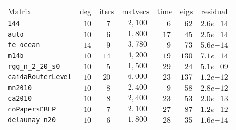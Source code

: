 \begin{tabular}{l|c|c|c|c|c|c}
\hline
\multirow{2}{*}{Matrix} & \multirow{2}{*}{deg} & \multirow{2}{*}{iters} & \multirow{2}{*}{matvecs} & \multirow{2}{*}{time} & \multirow{2}{*}{eigs} & \multirow{2}{*}{residual} \\
 & & & & & & \\\hline
\hline
\verb|144| & $\phantom{0}10$ & $\phantom{0}7$ & $\phantom{0}2,100$ & $\phantom{00}6$ & $\phantom{0}62$ & $2.6e{-14}$ \\\hline
\verb|auto| & $\phantom{0}10$ & $\phantom{0}6$ & $\phantom{0}1,800$ & $\phantom{0}17$ & $\phantom{0}45$ & $2.5e{-14}$ \\\hline
\verb|fe_ocean| & $\phantom{0}14$ & $\phantom{0}9$ & $\phantom{0}3,780$ & $\phantom{00}9$ & $\phantom{0}73$ & $5.6e{-14}$ \\\hline
\verb|m14b| & $\phantom{0}10$ & $14$ & $\phantom{0}4,200$ & $\phantom{0}19$ & $130$ & $7.1e{-14}$ \\\hline
\verb|rgg_n_2_20_s0| & $\phantom{0}10$ & $\phantom{0}5$ & $\phantom{0}1,500$ & $\phantom{0}29$ & $\phantom{0}24$ & $5.1e{-09}$ \\\hline
\verb|caidaRouterLevel| & $\phantom{0}10$ & $20$ & $\phantom{0}6,000$ & $\phantom{0}23$ & $137$ & $1.2e{-12}$ \\\hline
\verb|mn2010| & $\phantom{0}10$ & $\phantom{0}8$ & $\phantom{0}2,400$ & $\phantom{00}9$ & $\phantom{0}58$ & $2.8e{-12}$ \\\hline
\verb|ca2010| & $\phantom{0}10$ & $\phantom{0}8$ & $\phantom{0}2,400$ & $\phantom{0}23$ & $\phantom{0}53$ & $2.0e{-13}$ \\\hline
\verb|coPapersDBLP| & $\phantom{0}10$ & $\phantom{0}7$ & $\phantom{0}2,100$ & $\phantom{0}27$ & $\phantom{0}87$ & $1.2e{-12}$ \\\hline
\verb|delaunay_n20| & $\phantom{0}10$ & $\phantom{0}6$ & $\phantom{0}1,800$ & $\phantom{0}28$ & $\phantom{0}35$ & $1.6e{-14}$ \\\hline
\end{tabular}